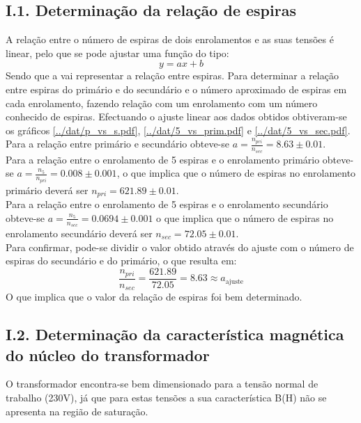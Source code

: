 \documentclass[%
  reprint,
  nofootinbib,
  amsmath,amssymb,
  aps,
  10pt,
]{revtex4-1}
\begin{document}
\subsection*{I.1. Determinação da relação de espiras}
A relação entre o número de espiras de dois enrolamentos e as suas tensões é linear, pelo que se pode ajustar uma função do tipo:
\begin{equation}
y=ax+b
\end{equation}
Sendo que a vai representar a relação entre espiras. Para determinar a relação entre espiras do primário e do secundário e o número aproximado de espiras em cada enrolamento, fazendo relação com um enrolamento com um número conhecido de espiras.
Efectuando o ajuste linear aos dados obtidos obtiveram-se os gráficos \ref{../dat/p_vs_s.pdf}, \ref{../dat/5_vs_prim.pdf} e \ref{../dat/5_vs_sec.pdf}.
Para a relação entre primário e secundário obteve-se $a=\frac{n_{pri}}{n_{sec}}=8.63\pm0.01$.\\
Para a relação entre o enrolamento de 5 espiras e o enrolamento primário obteve-se $a=\frac{n_{5}}{n_{pri}}=0.008\pm0.001$, o que implica que o número de espiras no enrolamento primário deverá ser $n_{pri}=621.89\pm0.01$.\\
Para a relação entre o enrolamento de 5 espiras e o enrolamento secundário obteve-se  $a=\frac{n_{5}}{n_{sec}}=0.0694\pm0.001$ o que implica que o número de espiras no enrolamento secundário deverá ser $n_{sec}=72.05\pm0.01$.\\
Para confirmar, pode-se dividir o valor obtido através do ajuste com o número de espiras do secundário e do primário, o que resulta em:
\begin{equation}
\frac{n_{pri}}{n_{sec}}=\frac{621.89}{72.05}=8.63\approx a_{\mathrm{ajuste}}
\end{equation}
 O que implica que o valor da relação de espiras foi bem determinado.

\subsection*{I.2. Determinação da característica magnética do núcleo do transformador}
O transformador encontra-se bem dimensionado para a tensão normal de trabalho (230V), já que para estas tensões a sua característica B(H) não se apresenta na região de saturação.
\end{document}

